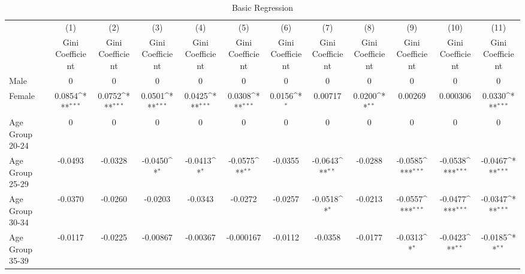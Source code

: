 \begin{table}[htbp]\centering
\def\sym#1{\ifmmode^{#1}\else\(^{#1}\)\fi}
\caption{Basic Regression\label{reg1}}
\begin{tabular}{l*{11}{c}}
\hline\hline
                    &\multicolumn{1}{c}{(1)}&\multicolumn{1}{c}{(2)}&\multicolumn{1}{c}{(3)}&\multicolumn{1}{c}{(4)}&\multicolumn{1}{c}{(5)}&\multicolumn{1}{c}{(6)}&\multicolumn{1}{c}{(7)}&\multicolumn{1}{c}{(8)}&\multicolumn{1}{c}{(9)}&\multicolumn{1}{c}{(10)}&\multicolumn{1}{c}{(11)}\\
                    &\multicolumn{1}{c}{Gini Coefficient}&\multicolumn{1}{c}{Gini Coefficient}&\multicolumn{1}{c}{Gini Coefficient}&\multicolumn{1}{c}{Gini Coefficient}&\multicolumn{1}{c}{Gini Coefficient}&\multicolumn{1}{c}{Gini Coefficient}&\multicolumn{1}{c}{Gini Coefficient}&\multicolumn{1}{c}{Gini Coefficient}&\multicolumn{1}{c}{Gini Coefficient}&\multicolumn{1}{c}{Gini Coefficient}&\multicolumn{1}{c}{Gini Coefficient}\\
\hline
Male                &           0         &           0         &           0         &           0         &           0         &           0         &           0         &           0         &           0         &           0         &           0         \\
Female              &      0.0854\sym{***}&      0.0752\sym{***}&      0.0501\sym{***}&      0.0425\sym{***}&      0.0308\sym{***}&      0.0156\sym{*}  &     0.00717         &      0.0200\sym{**} &     0.00269         &    0.000306         &      0.0330\sym{***}\\
Age Group 20-24     &           0         &           0         &           0         &           0         &           0         &           0         &           0         &           0         &           0         &           0         &           0         \\
Age Group 25-29     &     -0.0493         &     -0.0328         &     -0.0450\sym{*}  &     -0.0413\sym{*}  &     -0.0575\sym{**} &     -0.0355         &     -0.0643\sym{**} &     -0.0288         &     -0.0585\sym{***}&     -0.0538\sym{***}&     -0.0467\sym{***}\\
Age Group 30-34     &     -0.0370         &     -0.0260         &     -0.0203         &     -0.0343         &     -0.0272         &     -0.0257         &     -0.0518\sym{*}  &     -0.0213         &     -0.0557\sym{***}&     -0.0477\sym{***}&     -0.0347\sym{***}\\
Age Group 35-39     &     -0.0117         &     -0.0225         &    -0.00867         &    -0.00367         &   -0.000167         &     -0.0112         &     -0.0358         &     -0.0177         &     -0.0313\sym{*}  &     -0.0423\sym{**} &     -0.0185\sym{**} \\

\end{tabular}
\end{table}
